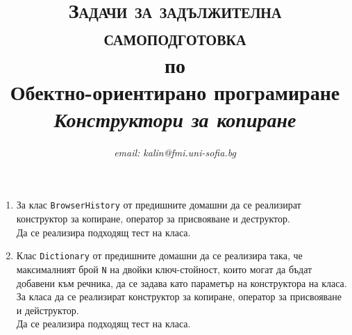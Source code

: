 \documentclass[12pt,a4paper]{article}
\author{\textit{email: kalin@fmi.uni-sofia.bg}}
\title{\textsc{Задачи за задължителна самоподготовка} \\
по \\
Обектно-ориентирано програмиране\\
\textit{Конструктори за копиране}}
\newcommand{\code}[1]{\texttt{#1}}
\begin{document}
\maketitle


\begin{enumerate}

\item За клас \code{BrowserHistory} от предишните домашни да се реализират конструктор за копиране, оператор за присвояване и деструктор.\\

Да се реализира подходящ тест на класа.

\item Клас \code{Dictionary} от предишните домашни да се реализира така, че максималният брой \code{N} на двойки ключ-стойност, които могат да бъдат добавени към речника, да се задава като параметър на конструктора на класа. За класа да се реализират конструктор за копиране, оператор за присвояване и дейструктор.\\

Да се реализира подходящ тест на класа.



\end{enumerate}


	\vspace{20px}
\end{document}
